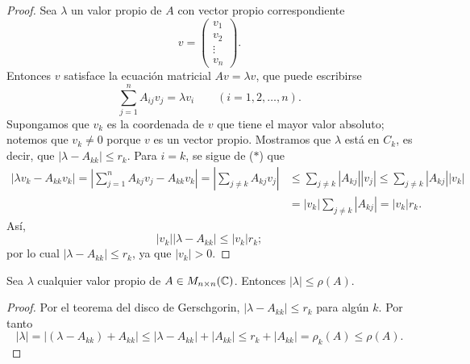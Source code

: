 \documentclass[12pt,a4paper]{book}
\begin{document}
    \begin{proof}
        Sea $\lambda$ un valor propio de $A$ con vector propio correspondiente
        \begin{equation*}
            v=\begin{pmatrix}v_1\\v_2\\\vdots\\v_n\end{pmatrix}.
        \end{equation*}
        Entonces $v$ satisface la ecuación matricial $Av=\lambda v$, que puede escribirse
        \begin{equation*}
            \sum_{j=1}^{n}A_{ij}v_j=\lambda v_i \qquad (i=1,2,\dots,n). \tag{$*$}
        \end{equation*}
        Supongamos que $v_k$ es la coordenada de $v$ que tiene el mayor valor absoluto; notemos que $v_k\neq 0$ porque $v$ es un vector propio. Mostramos que $\lambda$ está en $C_k$, es decir, que $|\lambda-A_{kk}|\leq r_k$. Para $i=k$, se sigue de ($*$) que
        \begin{align*}
            |\lambda v_k-A_{kk}v_k|=\left|\sum_{j=1}^{n}A_{kj}v_j-A_{kk}v_k\right|=\left|\sum_{j\neq k}A_{kj}v_j\right|
            &\leq\sum_{j\neq k}|A_{kj}||v_j|\leq\sum_{j\neq k}|A_{kj}||v_k|\\
            &=|v_k|\sum_{j\neq k}|A_{kj}|=|v_k|r_k.
        \end{align*}
        Así,
        \begin{equation*}
            |v_k||\lambda-A_{kk}|\leq|v_k|r_k;
        \end{equation*}
        por lo cual $|\lambda-A_{kk}|\leq r_k$, ya que $|v_k|>0$.
    \end{proof}

    \begin{corolario}
        Sea $\lambda$ cualquier valor propio de $A\in M_{n\times n}(\mathbb{C})$. Entonces $|\lambda|\leq\rho(A)$.
    \end{corolario}

    \begin{proof}
        Por el teorema del disco de Gerschgorin, $|\lambda-A_{kk}|\leq r_k$ para algún $k$. Por tanto
        \begin{equation*}
            |\lambda|=|(\lambda-A_{kk})+A_{kk}|\leq|\lambda-A_{kk}|+|A_{kk}|\leq r_k+|A_{kk}|=\rho_k(A)\leq\rho(A).
        \end{equation*}
    \end{proof}
\end{document}
